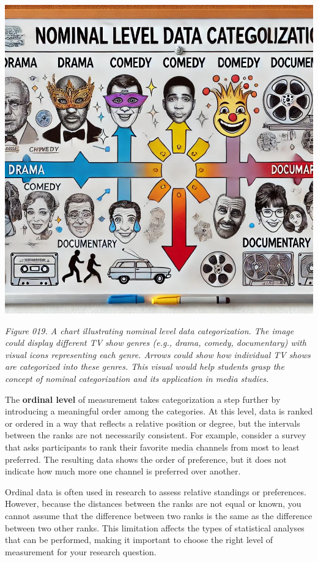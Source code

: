 \documentclass[
]{book}
\begin{document}
\includegraphics[width=1\textwidth,height=\textheight]{images/fig019.jpg}

\emph{Figure 019. A chart illustrating nominal level data categorization. The image could display different TV show genres (e.g., drama, comedy, documentary) with visual icons representing each genre. Arrows could show how individual TV shows are categorized into these genres. This visual would help students grasp the concept of nominal categorization and its application in media studies.}

The \textbf{ordinal level} of measurement takes categorization a step further by introducing a meaningful order among the categories. At this level, data is ranked or ordered in a way that reflects a relative position or degree, but the intervals between the ranks are not necessarily consistent. For example, consider a survey that asks participants to rank their favorite media channels from most to least preferred. The resulting data shows the order of preference, but it does not indicate how much more one channel is preferred over another.

Ordinal data is often used in research to assess relative standings or preferences. However, because the distances between the ranks are not equal or known, you cannot assume that the difference between two ranks is the same as the difference between two other ranks. This limitation affects the types of statistical analyses that can be performed, making it important to choose the right level of measurement for your research question.
\end{document}
